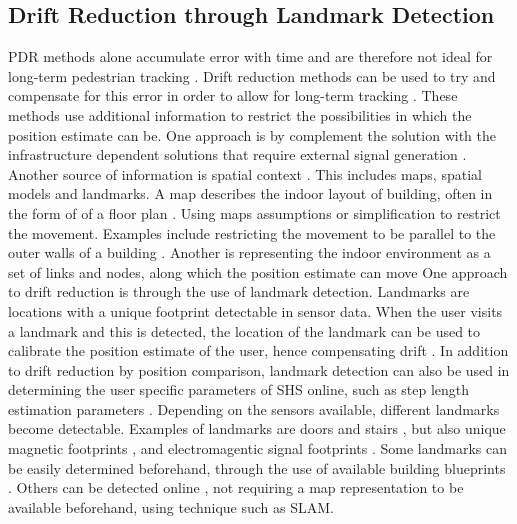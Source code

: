 
\subsection{Drift Reduction through Landmark Detection}
PDR methods alone accumulate error with time and are therefore not ideal for long-term pedestrian tracking \cite{Hardegger2012}. Drift reduction methods can be used to try and compensate for this error in order to allow for long-term tracking \cite{MunozDiaz2019a}.  These methods use additional information to restrict the possibilities in which the position estimate can be. One approach is by complement the solution with the infrastructure dependent solutions that require external signal generation \cite{Gu2019}. Another source of information is spatial context \cite{Gu2019}. This includes maps, spatial models and landmarks. A map describes the indoor layout of building, often in the form of of a floor plan \cite{Gu2019}. Using maps assumptions or simplification to restrict the movement. Examples include restricting the movement to be parallel to the outer walls of a building \cite{Abdulrahim2011}. Another is representing the indoor environment as a set of links and nodes, along which the position estimate can move \cite{Davidson2017,Jackermeier2018} 
One approach to drift reduction is through the use of landmark detection. Landmarks are locations with a unique footprint detectable in sensor data. When the user visits a landmark and this is detected, the location of the landmark can be used to calibrate the position estimate of the user, hence compensating drift \cite{Diaz2017}. In addition to drift reduction by position comparison, landmark detection can also be used in determining the user specific parameters of \ac{SHS} online, such as step length estimation parameters \cite{Gu2019,Shang2015}.  Depending on the sensors available, different landmarks become detectable. Examples of landmarks are doors and stairs \cite{Diaz2017,Gu2019,Torok2014}, but also unique magnetic footprints \cite{MunozDiaz2019}, and electromagentic signal footprints \cite{Gu2019}. Some landmarks can be easily determined beforehand, through the use of available building blueprints \cite{Gu2019}. Others can be detected online \cite{Hardegger2012, Hardegger2016}, not requiring a map representation to be available beforehand, using technique such as \ac{SLAM}. 

